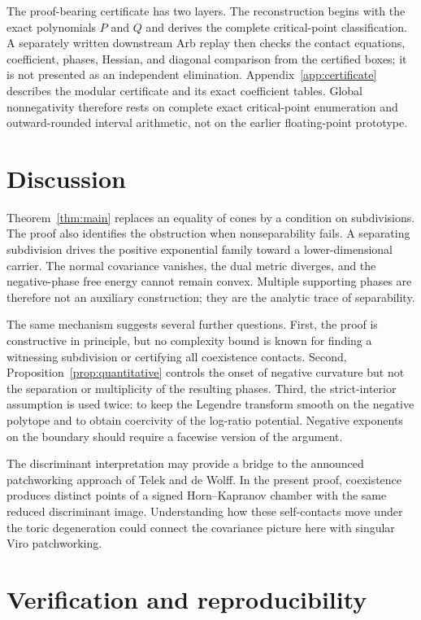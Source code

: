 \documentclass[11pt]{article}
\theoremstyle{plain}
\theoremstyle{definition}
\theoremstyle{remark}
\begin{document}
The proof-bearing certificate has two layers. The reconstruction begins with the exact polynomials $P$ and $Q$ and derives the complete critical-point classification. A separately written downstream Arb replay then checks the contact equations, coefficient, phases, Hessian, and diagonal comparison from the certified boxes; it is not presented as an independent elimination. Appendix~\ref{app:certificate} describes the modular certificate and its exact coefficient tables. Global nonnegativity therefore rests on complete exact critical-point enumeration and outward-rounded interval arithmetic, not on the earlier floating-point prototype.

\section{Discussion}

Theorem~\ref{thm:main} replaces an equality of cones by a condition on subdivisions. The proof also identifies the obstruction when nonseparability fails. A separating subdivision drives the positive exponential family toward a lower-dimensional carrier. The normal covariance vanishes, the dual metric diverges, and the negative-phase free energy cannot remain convex. Multiple supporting phases are therefore not an auxiliary construction; they are the analytic trace of separability.

The same mechanism suggests several further questions. First, the proof is constructive in principle, but no complexity bound is known for finding a witnessing subdivision or certifying all coexistence contacts. Second, Proposition~\ref{prop:quantitative} controls the onset of negative curvature but not the separation or multiplicity of the resulting phases. Third, the strict-interior assumption is used twice: to keep the Legendre transform smooth on the negative polytope and to obtain coercivity of the log-ratio potential. Negative exponents on the boundary should require a facewise version of the argument.

The discriminant interpretation may provide a bridge to the announced patchworking approach of Telek and de Wolff. In the present proof, coexistence produces distinct points of a signed Horn--Kapranov chamber with the same reduced discriminant image. Understanding how these self-contacts move under the toric degeneration could connect the covariance picture here with singular Viro patchworking.

\section{Verification and reproducibility}
\end{document}
